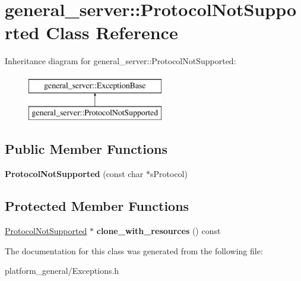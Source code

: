 \hypertarget{classgeneral__server_1_1ProtocolNotSupported}{\section{general\-\_\-server\-:\-:\-Protocol\-Not\-Supported \-Class \-Reference}
\label{classgeneral__server_1_1ProtocolNotSupported}
}
\-Inheritance diagram for general\-\_\-server\-:\-:\-Protocol\-Not\-Supported\-:\begin{figure}[H]
\begin{center}
\leavevmode
\includegraphics[height=2.000000cm]{classgeneral__server_1_1ProtocolNotSupported}
\end{center}
\end{figure}
\subsection*{\-Public \-Member \-Functions}
\begin{DoxyCompactItemize}
\item 
\hypertarget{classgeneral__server_1_1ProtocolNotSupported_acedce1aab7f3cb8b003ae28b272b61a8}{{\bfseries \-Protocol\-Not\-Supported} (const char $\ast$s\-Protocol)}\label{classgeneral__server_1_1ProtocolNotSupported_acedce1aab7f3cb8b003ae28b272b61a8}

\end{DoxyCompactItemize}
\subsection*{\-Protected \-Member \-Functions}
\begin{DoxyCompactItemize}
\item 
\hypertarget{classgeneral__server_1_1ProtocolNotSupported_a5ad3d68d91aaa33f83e0d3623e64b2a7}{\hyperlink{classgeneral__server_1_1ProtocolNotSupported}{\-Protocol\-Not\-Supported} $\ast$ {\bfseries clone\-\_\-with\-\_\-resources} () const }\label{classgeneral__server_1_1ProtocolNotSupported_a5ad3d68d91aaa33f83e0d3623e64b2a7}

\end{DoxyCompactItemize}


\-The documentation for this class was generated from the following file\-:\begin{DoxyCompactItemize}
\item 
platform\-\_\-general/\-Exceptions.\-h\end{DoxyCompactItemize}
